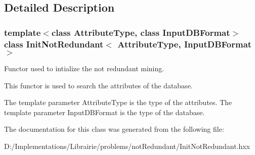 \subsection{Detailed Description}
\subsubsection*{template$<$class Attribute\-Type, class Input\-DBFormat$>$ class Init\-Not\-Redundant$<$ Attribute\-Type, Input\-DBFormat $>$}

Functor used to intialize the not redundant mining. 

This functor is used to search the attributes of the database.

The template parameter Attribute\-Type is the type of the attributes. The template parameter Input\-DBFormat is the type of the database. 



The documentation for this class was generated from the following file:\begin{CompactItemize}
\item 
D:/Implementations/Librairie/problems/not\-Redundant/Init\-Not\-Redundant.hxx\end{CompactItemize}

